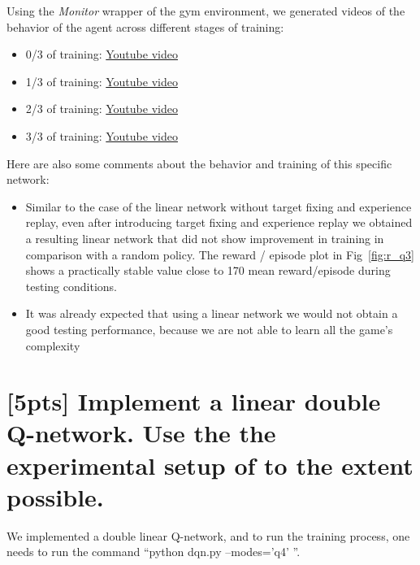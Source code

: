 \documentclass{article}
\begin{document}
Using the \textit{Monitor} wrapper of the gym environment, we generated videos of the behavior of the agent across different stages of training:

\begin{itemize}
  \item 0/3 of training: \href{https://youtu.be/fKvWyR8PrZc}{Youtube video}
  \item 1/3 of training: \href{https://youtu.be/NRdpff7ivfA}{Youtube video}
  \item 2/3 of training: \href{https://youtu.be/i-Voiqwufic}{Youtube video}
  \item 3/3 of training: \href{https://youtu.be/CXvo_i6CVeM}{Youtube video}
\end{itemize}

Here are also some comments about the behavior and training of this specific network:

\begin{itemize}
  \item Similar to the case of the linear network without target fixing and experience replay, even after introducing target fixing and experience replay we obtained a resulting linear network that did not show improvement in training in comparison with a random policy. The reward / episode plot in Fig~\ref{fig:r_q3} shows a practically stable value close to 170 mean reward/episode during testing conditions.
  \item It was already expected that using a linear network we would not obtain a good testing performance, because we are not able to learn all the game's complexity
\end{itemize}

\section{[5pts] Implement a linear double Q-network. Use the the experimental setup of \cite{mnih2013playing,mnih2015human} to the extent possible.}

We implemented a double linear Q-network, and to run the training process, one needs to run the command ``python dqn.py --modes='q4' ''.
\end{document}
